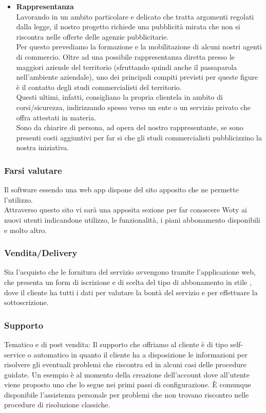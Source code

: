 \begin{itemize}
\item \textbf{Rappresentanza}\\
Lavorando in un ambito particolare e delicato che tratta argomenti regolati dalla legge, il nostro progetto richiede una pubblicità mirata che non si riscontra nelle offerte delle agenzie pubblicitarie.\\ Per questo prevediamo la formazione e la mobilitazione di alcuni nostri agenti di commercio. Oltre ad una possibile rappresentanza diretta presso le maggiori aziende del territorio (sfruttando quindi anche il passaparola nell'ambiente aziendale), uno dei principali compiti previsti per queste figure è il contatto degli studi commercialisti del territorio.\\ Questi ultimi, infatti, consigliano la propria clientela in ambito di corsi/sicurezza, indirizzando spesso verso un ente o un servizio privato che offra attestati in materia.\\ Sono da chiarire di persona, ad opera del nostro rappresentante, se sono presenti costi aggiuntivi per far si che gli studi commercialisti pubblicizzino la nostra iniziativa.

\end{itemize}

\subsubsection{Farsi valutare}
Il software essendo una web app dispone del sito apposito che ne permette l'utilizzo.\\
Attraverso questo sito vi sarà una apposita sezione per far conoscere Woty ai nuovi utenti indicandone utilizzo, le funzionalità, i piani abbonamento disponibili e molto altro.

\subsubsection{Vendita/Delivery}
Sia l'acquisto che le fornitura del servizio avvengono tramite l'applicazione web, che presenta un form di iscrizione e di scelta del tipo di abbonamento in stile , dove il cliente ha tutti i dati per valutare la bontà del servizio e per effettuare la sottoscrizione.

\subsubsection{Supporto}
Tematico e di post vendita: Il supporto che offriamo al cliente è di tipo self-service o automatico in quanto il cliente ha a disposizione le informazioni per risolvere gli eventuali problemi che riscontra ed in alcuni casi delle procedure guidate. Un esempio è al momento della creazione dell'account dove all'utente viene proposto uno  che lo segue nei primi passi di configurazione. È	 comunque disponibile l'assistenza personale per problemi che non trovano riscontro nelle procedure di risoluzione classiche.

